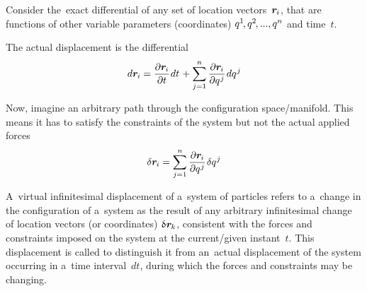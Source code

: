 {\small
\setlength{\abovedisplayskip}{2pt}\setlength{\belowdisplayskip}{2pt}

Consider the~exact differential of any set of location vectors~${\bm{r}_{\hspace{-0.1ex}i}}$, that are functions of other variable parameters (coordinates) ${q^{1} \hspace{-0.25ex}, q^{2} \hspace{-0.25ex}, ..., q^{n}}$ and time~$t$.

The actual displacement is the differential
\[
\displaystyle d\bm{r}_{\hspace{-0.1ex}i} = \frac{\partial \bm{r}_{\hspace{-0.1ex}i}}{\partial t} \hspace{.16ex} dt \hspace{.2ex} + \sum_{j=1}^{n} {\frac{\partial \bm{r}_{\hspace{-0.1ex}i}}{\partial q^{\hspace{.1ex}j}}} \hspace{.2ex} dq^{\hspace{.1ex}j}
\]

Now, imagine an arbitrary path through the configuration space/manifold. This means it has to satisfy the constraints of the system but not the actual applied forces
\[
\delta \bm{r}_{\hspace{-0.1ex}i} = \displaystyle\sum_{j=1}^{n} {\displaystyle\frac {\partial \bm{r}_{\hspace{-0.1ex}i}}{\partial q^{\hspace{.1ex}j}}} \hspace{.2ex} \delta q^{\hspace{.1ex}j}
\]

\par}

A~virtual infinitesimal displacement of a~system of particles refers to a~change in the configuration of a~system as the result of any arbitrary infinitesimal change of location vectors (or coordinates) ${\variation{\hspace{.1ex}\locationvector_{\hspace{-0.1ex}k}}}$, consistent with the forces and constraints imposed on the system at the current/given instant~$t$.
This displacement is called  to distinguish it from an~actual displacement of the system occurring in a~time interval~${dt}$, during which the forces and constraints may be changing.

